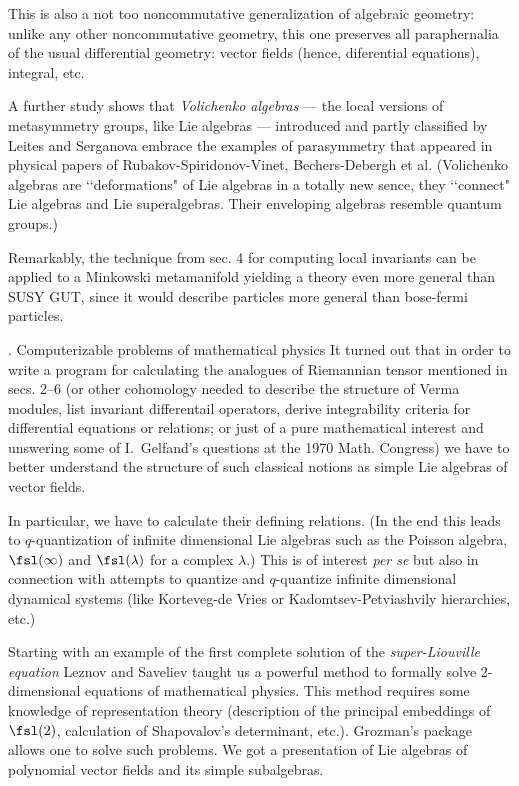 This is also a not too noncommutative generalization of algebraic geometry:
unlike any other
noncommutative geometry, this one preserves all paraphernalia of the usual
differential
geometry: vector fields (hence,  diferential equations), integral, etc.

A further study shows that {\it Volichenko algebras} --- the local versions
of metasymmetry
groups, like Lie algebras ---  introduced and partly classified by Leites
and Serganova
embrace the examples of parasymmetry that appeared in physical papers  of
Rubakov-Spiridonov-Vinet, Bechers-Debergh et al. (Volichenko algebras are
\lq\lq deformations" of 
Lie algebras in a totally new sence, they \lq\lq connect" Lie algebras and
Lie superalgebras.
Their enveloping algebras resemble quantum groups.)

Remarkably, the technique from sec. 4 for computing local invariants can be
applied to a
Minkowski metamanifold  yielding a theory even more general than SUSY GUT,
since it would
describe particles more general than bose-fermi particles.

. Computerizable problems of mathematical physics\endsubhead
It turned out that in order to write a program for calculating the
analogues of Riemannian
tensor mentioned in secs. 2--6 (or other cohomology needed to describe the
structure of Verma
modules, list invariant differentail operators, derive integrability
criteria for
differential equations or relations; or just of a pure mathematical
interest and unswering
some of I.~Gelfand's questions at the 1970 Math. Congress) we have to better
understand the structure of such classical notions as simple Lie algebras
of vector fields.

In particular, we have to calculate their defining relations. (In the end
this leads to 
$q$-quantization of infinite dimensional Lie algebras such as the Poisson
algebra, $\fsl
(\infty)$ and $\fsl(\lambda)$ for a complex $\lambda$.) This is of interest
{\it per se} 
but also in connection with attempts to quantize and $q$-quantize infinite
dimensional 
dynamical systems (like Korteveg-de Vries or Kadomtsev-Petviashvily hierarchies,
etc.) 

Starting with an example of the first complete solution of the {\it
super-Liouville equation}
Leznov and Saveliev taught us a powerful method to formally solve 2-dimensional
equations of mathematical physics. This method requires some knowledge of
representation theory (description of the principal embeddings of $\fsl(2)$,
calculation of Shapovalov's determinant, etc.). Grozman's package allows
one to solve such
problems. We got a presentation of Lie algebras of polynomial vector fields and 
its simple subalgebras. 

